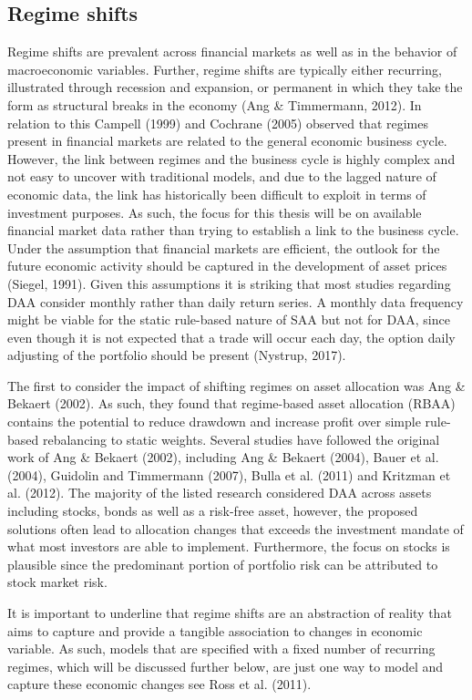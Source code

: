 \subsection*{Regime shifts}
Regime shifts are prevalent across financial markets as well as in the behavior of macroeconomic variables. Further, regime shifts are typically either recurring, illustrated through recession and expansion, or permanent in which they take the form as structural breaks in the economy (Ang \& Timmermann, 2012). In relation to this Campell (1999) and Cochrane (2005) observed that regimes present in financial markets are related to the general economic business cycle. However, the link between regimes and the business cycle is highly complex and not easy to uncover with traditional models, and due to the lagged nature of economic data, the link has historically been difficult to exploit in terms of investment purposes. As such, the focus for this thesis will be on available financial market data rather than trying to establish a link to the business cycle. Under the assumption that financial markets are efficient, the outlook for the future economic activity should be captured in the development of asset prices (Siegel, 1991). Given this assumptions it is striking that most studies regarding DAA consider monthly rather than daily return series. A monthly data frequency might be viable for the static rule-based nature of SAA but not for DAA, since even though it is not expected that a trade will occur each day, the option daily adjusting of the portfolio should be present (Nystrup, 2017). 

The first to consider the impact of shifting regimes on asset allocation was Ang \& Bekaert (2002). As such, they found that regime-based asset allocation (RBAA) contains the potential to reduce drawdown and increase profit over simple rule-based rebalancing to static weights. Several studies have followed the original work of Ang \& Bekaert (2002), including Ang \& Bekaert (2004), Bauer et al.
(2004), Guidolin and Timmermann (2007), Bulla et al. (2011) and Kritzman et al. (2012). The majority of the listed research considered DAA across assets including stocks, bonds as well as a risk-free asset, however, the proposed solutions often lead to allocation changes that exceeds the investment mandate of what most investors are able to implement. Furthermore, the focus on stocks is plausible since the predominant portion of portfolio risk can be attributed to stock market risk. 

It is important to underline that regime shifts are an abstraction of reality that aims to capture and provide a tangible association to changes in economic variable. As such, models that are specified with a fixed number of recurring regimes, which will be discussed further below, are just one way to model and capture these economic changes see Ross et al. (2011). 


